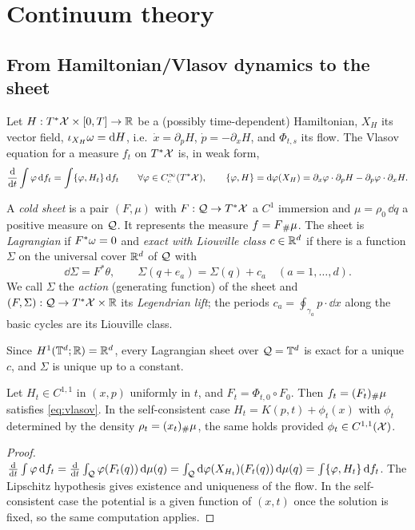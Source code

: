 \section{Continuum theory}\label{sec:continuum}

\subsection{From Hamiltonian/Vlasov dynamics to the sheet}

Let $H:T^*\mathcal{X}\times[0,T]\to\mathbb{R}$ be a (possibly time-dependent) Hamiltonian, $X_H$ its vector field,
$\iota_{X_H}\omega=\mathrm{d} H$, i.e.\ $\dot x=\partial_pH$, $\dot p=-\partial_xH$, and $\Phi_{t,s}$ its flow. The Vlasov
equation for a measure $f_t$ on $T^*\mathcal{X}$ is, in weak form,
\begin{equation}\label{eq:vlasov}
\frac{\mathrm{d}}{\mathrm{d} t}\int\varphi\,\mathrm{d} f_t=\int\{\varphi,H_t\}\,\mathrm{d} f_t\qquad\forall\varphi\in C_c^\infty(T^*\mathcal{X}),\qquad
\{\varphi,H\}=\mathrm{d}\varphi(X_H)=\partial_x\varphi\cdot\partial_pH-\partial_p\varphi\cdot\partial_xH .
\end{equation}

\begin{definition}\label{def:sheet}
A \emph{cold sheet} is a pair $(F,\mu)$ with $F:\mathcal{Q}\to T^*\mathcal{X}$ a $C^1$ immersion and $\mu=\rho_0\,\dd q$ a positive
measure on $\mathcal{Q}$. It represents the measure $f=F{}_{\#}\mu$. The sheet is \emph{Lagrangian} if $F^*\omega=0$ and
\emph{exact with Liouville class $c\in\mathbb{R}^d$} if there is a function $\Sigma$ on the universal cover $\mathbb{R}^d$ of $\mathcal{Q}$ with
\begin{equation}\label{eq:exact}
\dd\Sigma=F^*\theta,\qquad \Sigma(q+e_a)=\Sigma(q)+c_a\quad(a=1,\dots,d).
\end{equation}
We call $\Sigma$ the \emph{action} (generating function) of the sheet and $(F,\Sigma):\mathcal{Q}\to T^*\mathcal{X}\times\mathbb{R}$ its
\emph{Legendrian lift}; the periods $c_a=\oint_{\gamma_a}p\cdot\dd x$ along the basic cycles are its Liouville class.
\end{definition}

Since $H^1(\mathbb{T}^d;\mathbb{R})=\mathbb{R}^d$, every Lagrangian sheet over $\mathcal{Q}=\mathbb{T}^d$ is exact for a unique $c$, and $\Sigma$ is unique
up to a constant.

\begin{proposition}\label{prop:vlasov}
Let $H_t\in C^{1,1}$ in $(x,p)$ uniformly in $t$, and $F_t=\Phi_{t,0}\circ F_0$. Then $f_t=(F_t){}_{\#}\mu$ satisfies
\eqref{eq:vlasov}. In the self-consistent case $H_t=K(p,t)+\phi_t(x)$ with $\phi_t$ determined by the density
$\rho_t=(x_t){}_{\#}\mu$, the same holds provided $\phi_t\in C^{1,1}(\mathcal{X})$.
\end{proposition}
\begin{proof}
$\frac{\mathrm{d}}{\mathrm{d} t}\int\varphi\,\mathrm{d} f_t=\frac{\mathrm{d}}{\mathrm{d} t}\int_{\mathcal{Q}}\varphi(F_t(q))\,\mathrm{d}\mu(q)
=\int_{\mathcal{Q}}\mathrm{d}\varphi(X_{H_t})(F_t(q))\,\mathrm{d}\mu(q)=\int\{\varphi,H_t\}\,\mathrm{d} f_t$. The Lipschitz hypothesis gives
existence and uniqueness of the flow. In the self-consistent case the potential is a given function of $(x,t)$
once the solution is fixed, so the same computation applies.
\end{proof}

